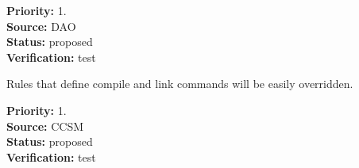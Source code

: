 \begin{reqlist}
{\bf Priority:} 1. \\
{\bf Source:} DAO \\
{\bf Status:} proposed \\
{\bf Verification:} test
\end{reqlist}

Rules that define compile and link commands will be
easily overridden.

\begin{reqlist}
{\bf Priority:} 1. \\
{\bf Source:} CCSM \\
{\bf Status:} proposed \\
{\bf Verification:} test
\end{reqlist}


